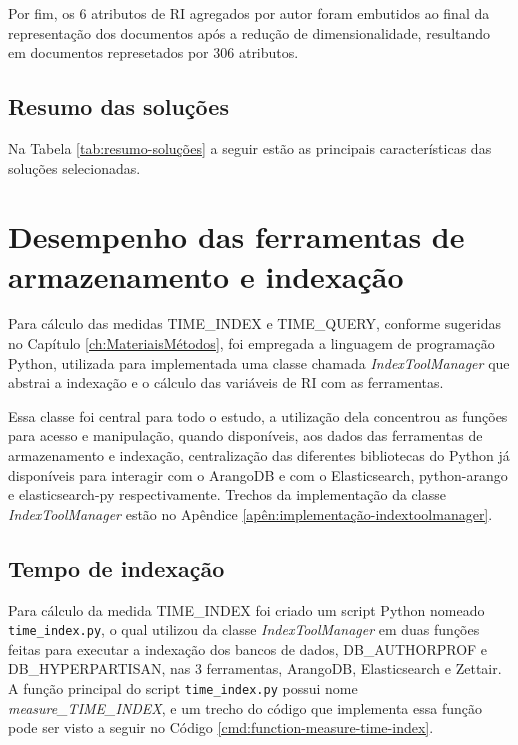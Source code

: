 				

				Por fim, os 6 atributos de RI agregados por autor foram embutidos ao final da representação dos documentos após a redução de dimensionalidade, resultando em documentos represetados por 306 atributos.


		\subsection{Resumo das soluções} \label{sec:ResumoDasSoluções}
			Na Tabela \ref{tab:resumo-soluções} a seguir estão as principais características das soluções selecionadas.

			

	\section{Desempenho das ferramentas de armazenamento e indexação} \label{sec:DesempenhoFerramentas}
		Para cálculo das medidas TIME\_INDEX e TIME\_QUERY, conforme sugeridas no Capítulo \ref{ch:MateriaisMétodos}, foi empregada a linguagem de programação Python, utilizada para implementada uma classe chamada \textit{IndexToolManager} que abstrai a indexação e o cálculo das variáveis de RI com as ferramentas. 

		Essa classe foi central para todo o estudo, a utilização dela concentrou as funções para acesso e manipulação, quando disponíveis, aos dados das ferramentas de armazenamento e indexação, centralização das diferentes bibliotecas do Python já disponíveis para interagir com o ArangoDB e com o Elasticsearch, python-arango e elasticsearch-py respectivamente. 
		Trechos da implementação da classe \textit{IndexToolManager} estão no Apêndice \ref{apên:implementação-indextoolmanager}.
		\subsection{Tempo de indexação}
			Para cálculo da medida TIME\_INDEX foi criado um script Python nomeado \texttt{time\_index.py}, o qual utilizou da classe \textit{IndexToolManager} em duas funções feitas para executar a indexação dos bancos de dados, DB\_AUTHORPROF e DB\_HYPERPARTISAN, nas 3 ferramentas, ArangoDB, Elasticsearch e Zettair.
			A função principal do script \texttt{time\_index.py} possui nome \textit{measure\_TIME\_INDEX}, e um trecho do código que implementa essa função pode ser visto a seguir no Código \ref{cmd:function-measure-time-index}.

